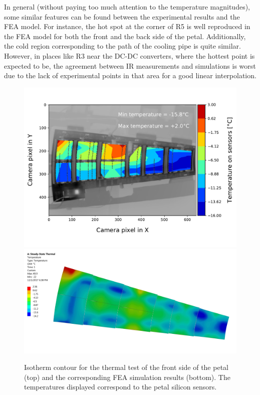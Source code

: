 		In general (without paying too much attention to the temperature magnitudes), some similar features can be found between the experimental results and the FEA model. For instance, the hot spot at the corner of R5 is well reproduced in the FEA model for both the front and the back side of the petal. Additionally, the cold region corresponding to the path of the cooling pipe is quite similar. However, in places like R3 near the DC-DC converters, where the hottest point is expected to be, the agreement between IR measurements and simulations is worst due to the lack of experimental points in that area for a good linear interpolation.
	
		\begin{landscape}	
			\begin{figure}
				\centering
				\captionsetup{justification=centering,margin=0cm}
				\includegraphics[scale=0.65]{Figures/Chapter04/thermogram_markers_2_201711271001.pdf}
				\includegraphics[scale=0.045]{Figures/Chapter04/FEA_thermogram_markers_2_201711271001.jpg}
				\caption{Isotherm contour for the thermal test of the front side of the petal (top) and the corresponding FEA simulation results (bottom). The temperatures displayed correspond to the petal silicon sensors.}\label{fig4.8}
			\end{figure}	
		\end{landscape}	
		
